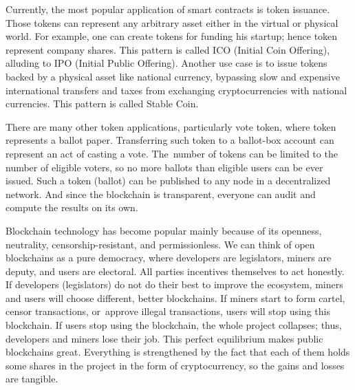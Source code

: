 \documentclass[applsci,article,accept,moreauthors,pdftex]{Definitions/mdpi}
\begin{document}
Currently, the most popular application of smart contracts is token issuance. Those tokens can represent any arbitrary asset either in the virtual or physical world.
For example, one can create tokens for funding his startup; hence token represent company shares. This pattern is called ICO (Initial Coin Offering), alluding to IPO (Initial Public Offering).
Another use case is to issue tokens backed by a physical asset like national currency, bypassing slow and expensive international transfers and taxes from exchanging cryptocurrencies with national currencies. This pattern is called Stable Coin. 

There are many other token applications, particularly vote token, where token represents a ballot paper. Transferring such token to a ballot-box account can represent an act of casting a vote. The~number of tokens can be limited to the number of eligible voters, so no more ballots than eligible users can be ever issued. Such a token (ballot) can be published to any node in a decentralized network. And since the blockchain is transparent, everyone can audit and compute the results on its own.
\vspace{6pt}

\vspace{6pt}

Blockchain technology has become popular mainly because of its openness, neutrality, censorship-resistant, and permissionless.  We can think of open blockchains as a pure democracy, where developers are legislators, miners are deputy, and users are electoral. All parties incentives themselves to act honestly. If developers (legislators) do not do their best to improve the ecosystem, miners and users will choose different, better blockchains. If miners start to form cartel, censor transactions, or~approve illegal transactions, users will stop using this blockchain. If users stop using the blockchain, the whole project collapses; thus, developers and miners lose their job. This perfect equilibrium makes public blockchains great. Everything is strengthened by the fact that each of them holds some shares in the project in the form of cryptocurrency, so the gains and losses are tangible. 
\end{document}
